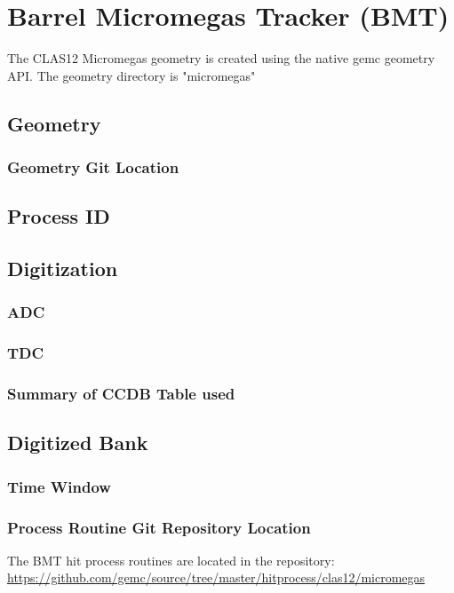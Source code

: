 \section{Barrel Micromegas Tracker (BMT)}

The CLAS12 Micromegas geometry is created using the native gemc geometry API.
The geometry directory is "micromegas"

\subsection{Geometry}

\subsubsection{Geometry Git Location}

\subsection{Process ID}

\subsection{Digitization}


\subsubsection{ADC}
\subsubsection{TDC}

\subsubsection{Summary of CCDB Table used}

\subsection{Digitized Bank}

\subsubsection{Time Window}

\subsubsection{Process Routine Git Repository Location}


The BMT hit process routines are located in the repository: \url{https://github.com/gemc/source/tree/master/hitprocess/clas12/micromegas}
